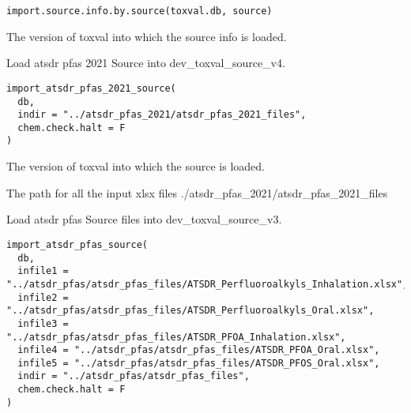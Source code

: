 \documentclass[letterpaper]{book}
\begin{document}
%
\begin{Usage}
\begin{verbatim}
import.source.info.by.source(toxval.db, source)
\end{verbatim}
\end{Usage}
%
\begin{Arguments}
\begin{ldescription}
\item[\code{toxval.db}] The version of toxval into which the source info is loaded.
\end{ldescription}
\end{Arguments}
%
\begin{Description}\relax
Load atsdr pfas 2021 Source into dev\_toxval\_source\_v4.
\end{Description}
%
\begin{Usage}
\begin{verbatim}
import_atsdr_pfas_2021_source(
  db,
  indir = "../atsdr_pfas_2021/atsdr_pfas_2021_files",
  chem.check.halt = F
)
\end{verbatim}
\end{Usage}
%
\begin{Arguments}
\begin{ldescription}
\item[\code{db}] The version of toxval into which the source is loaded.

\item[\code{indir}] The path for all the input xlsx files ./atsdr\_pfas\_2021/atsdr\_pfas\_2021\_files
\end{ldescription}
\end{Arguments}
%
\begin{Description}\relax
Load atsdr pfas Source files into dev\_toxval\_source\_v3.
\end{Description}
%
\begin{Usage}
\begin{verbatim}
import_atsdr_pfas_source(
  db,
  infile1 = "../atsdr_pfas/atsdr_pfas_files/ATSDR_Perfluoroalkyls_Inhalation.xlsx",
  infile2 = "../atsdr_pfas/atsdr_pfas_files/ATSDR_Perfluoroalkyls_Oral.xlsx",
  infile3 = "../atsdr_pfas/atsdr_pfas_files/ATSDR_PFOA_Inhalation.xlsx",
  infile4 = "../atsdr_pfas/atsdr_pfas_files/ATSDR_PFOA_Oral.xlsx",
  infile5 = "../atsdr_pfas/atsdr_pfas_files/ATSDR_PFOS_Oral.xlsx",
  indir = "../atsdr_pfas/atsdr_pfas_files",
  chem.check.halt = F
)
\end{verbatim}
\end{Usage}
\end{document}
